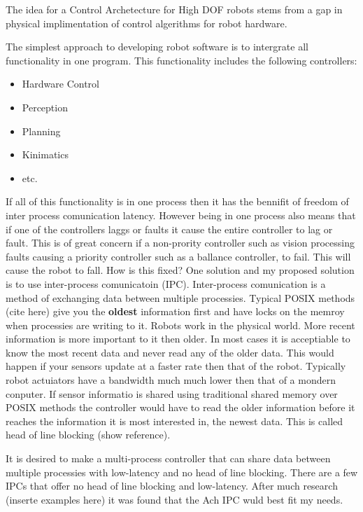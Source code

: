 


The idea for a Control Archetecture for High DOF robots stems from a gap in physical implimentation of control algerithms for robot hardware.

The simplest approach to developing robot software is to intergrate all functionality in one program.  
This functionality includes the following controllers:
\begin{itemize}
\item Hardware Control
\item Perception
\item Planning
\item Kinimatics
\item etc.
\end{itemize}

If all of this functionality is in one process then it has the bennifit of freedom of inter process comunication latency.
However being in one process also means that if one of the controllers laggs or faults it cause the entire controller to lag or fault.
This is of great concern if a non-prority controller such as vision processing faults causing a priority controller such as a ballance controller, to fail.
This will cause the robot to fall.
How is this fixed?
One solution and my proposed solution is to use inter-process comunicatoin (IPC).
Inter-process comunication is a method of exchanging data between multiple processies.
Typical POSIX methods (cite here) give you the \textbf{oldest} information first and have locks on the memroy when processies are writing to it.
Robots work in the physical world. 
More recent information is more important to it then older.
In most cases it is acceptiable to know the most recent data and never read any of the older data.
This would happen if your sensors update at a faster rate then that of the robot.
Typically robot actuiators have a bandwidth much much lower then that of a mondern conputer.
If sensor informatio is shared using traditional shared memory over POSIX methods the controller would have to read the older information before it reaches the information it is most interested in, the newest data.
This is called head of line blocking (show reference).

It is desired to make a multi-process controller that can share data between multiple processies with low-latency and no head of line blocking.
There are a few IPCs that offer no head of line blocking and low-latency.  
After much research (inserte examples here) it was found that the Ach IPC wuld best fit my needs.


